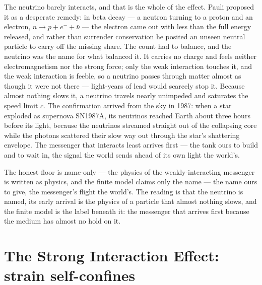 The neutrino barely interacts, and that is the whole of the effect. Pauli proposed it as a desperate remedy: in
beta decay --- a neutron turning to a proton and an electron, $n \to p + e^- + \bar\nu$ --- the electron came
out with less than the full energy released, and rather than surrender conservation he posited an unseen
neutral particle to carry off the missing share. The count had to balance, and the neutrino was the name for
what balanced it. It carries no charge and feels neither
electromagnetism nor the strong force; only the weak interaction touches it, and the weak interaction is
feeble, so a neutrino passes through matter almost as though it were not there --- light-years of lead would
scarcely stop it. Because almost nothing slows it, a neutrino travels nearly unimpeded and saturates the speed
limit $c$. The confirmation arrived from the sky in 1987: when a star exploded as supernova SN1987A, its
neutrinos reached Earth about three hours before its light, because the neutrinos streamed straight out of the
collapsing core while the photons scattered their slow way out through the star's shattering envelope. The
messenger that interacts least arrives first --- the tank ours to build and to wait in, the signal the world
sends ahead of its own light the world's.

The honest floor is name-only --- the physics of the weakly-interacting messenger is written as physics, and
the finite model claims only the name --- the name ours to give, the messenger's flight the world's. The
reading is that the neutrino is named, its early arrival is the
physics of a particle that almost nothing slows, and the finite model is the label beneath it: the messenger
that arrives first because the medium has almost no hold on it.

\section{The Strong Interaction Effect: strain self-confines}
\label{se:strong-interaction}

